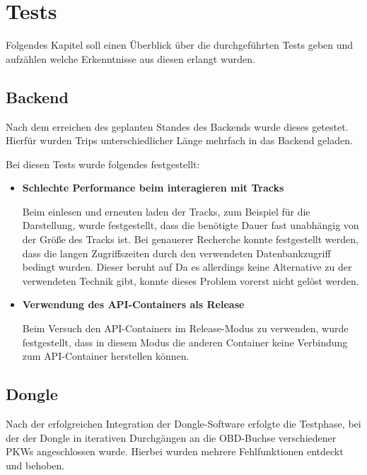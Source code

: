 \chapter{Tests}
\label{sec:test}
Folgendes Kapitel soll einen Überblick über die durchgeführten Tests geben und aufzählen welche Erkenntnisse aus diesen erlangt wurden.

\section{Backend}
Nach dem erreichen des geplanten Standes des Backends wurde dieses getestet. Hierfür wurden Trips unterschiedlicher Länge mehrfach in das Backend geladen. 

Bei diesen Tests wurde folgendes festgestellt:
\begin{itemize}
	\item \textbf{Schlechte Performance beim interagieren mit Tracks}
	
	Beim einlesen und erneuten laden der Tracks, zum Beispiel für die Darstellung, wurde festgestellt, dass die benötigte Dauer fast unabhängig von der Größe des Tracks ist. Bei genauerer Recherche konnte festgestellt werden, dass die langen Zugriffszeiten durch den verwendeten Datenbankzugriff bedingt wurden. Dieser beruht auf %
	Da es allerdings keine Alternative zu der verwendeten Technik gibt, konnte dieses Problem vorerst nicht gelöst werden.
	
	\item \textbf{Verwendung des \ac{API}-Containers als Release}
	
	Beim Versuch den \ac{API}-Containers im Release-Modus zu verwenden, wurde festgestellt, dass in diesem Modus die anderen Container keine Verbindung zum \ac{API}-Container herstellen können. %
	
\end{itemize}

\section{Dongle}
\label{sec:dongleTest}
Nach der erfolgreichen Integration der Dongle-Software erfolgte die Testphase, bei der der Dongle in iterativen Durchgängen an die OBD-Buchse verschiedener PKWs angeschlossen wurde. Hierbei wurden mehrere Fehlfunktionen entdeckt und behoben.
